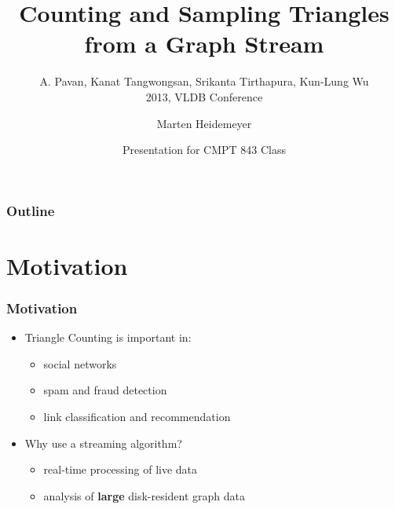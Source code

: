 \documentclass[11pt]{beamer}
\title[Counting and Sampling Triangles from a Graph Stream] %
{Counting and Sampling Triangles from a Graph Stream}
\subtitle{A. Pavan, Kanat Tangwongsan, Srikanta Tirthapura, Kun-Lung Wu\\2013, VLDB Conference}
\author[] %
{Marten Heidemeyer}
\date[\today] %
{Presentation for CMPT 843 Class}
\begin{document}
\frame{\titlepage}
\begin{frame}
\frametitle{Outline}
\tableofcontents[]
\end{frame}
\section{Motivation}
\begin{frame}
\frametitle{Motivation}
\begin{itemize}
\item Triangle Counting is important in:
\begin{itemize}
\item social networks
\item spam and fraud detection
\item link classification and recommendation
\end{itemize}
\item Why use a streaming algorithm?
\begin{itemize}
\item real-time processing of live data
\item analysis of \textbf{large} disk-resident graph data
\end{itemize}
\end{itemize}
\end{frame}
\end{document}
